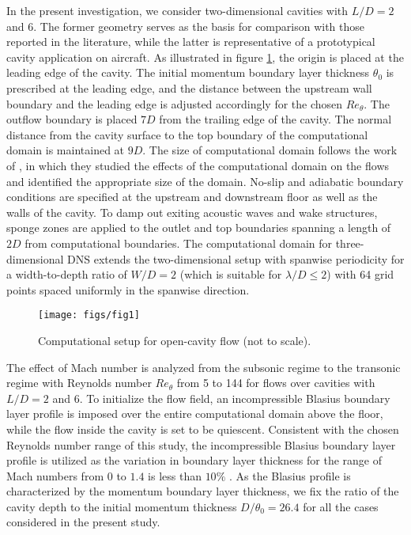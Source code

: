 \documentclass{jfm}
\begin{document}
In the present investigation, we consider two-dimensional cavities with $L/D = 2$ and 6. The former geometry serves as the basis for comparison with those reported in the literature, while the latter is representative of a prototypical cavity application on aircraft. As illustrated in figure \ref{fig:setup}, the origin is placed at the leading edge of the cavity. The initial momentum boundary layer thickness $\theta_0$ is prescribed at the leading edge, and the distance between the upstream wall boundary and the leading edge is adjusted accordingly for the chosen $Re_\theta$. The outflow boundary is placed $7D$ from the trailing edge of the cavity. The normal distance from the cavity surface to the top boundary of the computational domain is maintained at $9D$. The size of computational domain follows the work of \cite{Colonius:99}, in which they studied the effects of the computational domain on the flows and identified the appropriate size of the domain. No-slip and adiabatic boundary conditions are specified at the upstream and downstream floor as well as the walls of the cavity. To damp out exiting acoustic waves and wake structures, sponge zones \citep{Freund:AIAAJ97} are applied to the outlet and top boundaries spanning a length of $2D$ from computational boundaries. The computational domain for three-dimensional DNS extends the two-dimensional setup with spanwise periodicity for a width-to-depth ratio of $W/D=2$ (which is suitable for $\lambda/D\le2$) with 64 grid points spaced uniformly in the spanwise direction.
\begin{figure}
\begin{center}
   \texttt{[image: figs/fig1]}
   \caption{Computational setup for open-cavity flow (not to scale).}
   \label{fig:setup}
\vspace{-0.2in}
\end{center}
\end{figure}

The effect of Mach number is analyzed from the subsonic regime to the transonic regime with Reynolds number $Re_\theta$ from 5 to 144 for flows over cavities with $L/D = 2$ and 6. To initialize the flow field, an incompressible Blasius boundary layer profile is imposed over the entire computational domain above the floor, while the flow inside the cavity is set to be quiescent. Consistent with the chosen Reynolds number range of this study, the incompressible Blasius boundary layer profile is utilized as the variation in boundary layer thickness for the range of Mach numbers from $0$ to $1.4$ is less than $10\%$ \citep{white91}. As the Blasius profile is characterized by the momentum boundary layer thickness, we fix the ratio of the cavity depth to the initial momentum thickness $D/\theta_0 = 26.4$ for all the cases considered in the present study.
\end{document}

